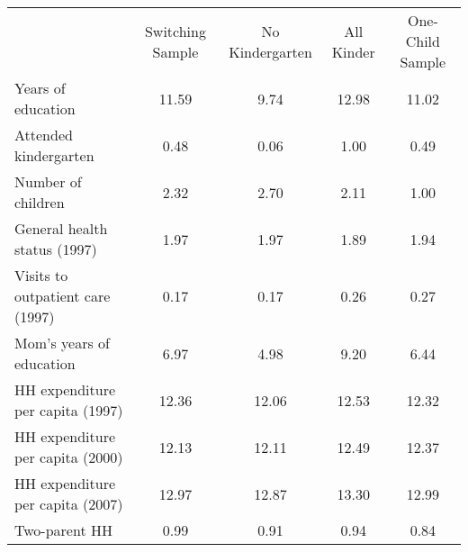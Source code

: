 \begin{tabular}{lllll}
\cline{1-5}
\multicolumn{1}{c}{} &
  \multicolumn{1}{|c}{Switching Sample} &
  \multicolumn{1}{c}{No Kindergarten} &
  \multicolumn{1}{c}{All Kinder} &
  \multicolumn{1}{c}{One-Child Sample} \\
\cline{1-5}
\multicolumn{1}{l}{Years of education} &
  \multicolumn{1}{|c}{11.59} &
  \multicolumn{1}{c}{9.74} &
  \multicolumn{1}{c}{12.98} &
  \multicolumn{1}{c}{11.02} \\
\multicolumn{1}{l}{Attended kindergarten} &
  \multicolumn{1}{|c}{0.48} &
  \multicolumn{1}{c}{0.06} &
  \multicolumn{1}{c}{1.00} &
  \multicolumn{1}{c}{0.49} \\
\multicolumn{1}{l}{Number of children} &
  \multicolumn{1}{|c}{2.32} &
  \multicolumn{1}{c}{2.70} &
  \multicolumn{1}{c}{2.11} &
  \multicolumn{1}{c}{1.00} \\
\multicolumn{1}{l}{General health status (1997)} &
  \multicolumn{1}{|c}{1.97} &
  \multicolumn{1}{c}{1.97} &
  \multicolumn{1}{c}{1.89} &
  \multicolumn{1}{c}{1.94} \\
\multicolumn{1}{l}{Visits to outpatient care (1997)} &
  \multicolumn{1}{|c}{0.17} &
  \multicolumn{1}{c}{0.17} &
  \multicolumn{1}{c}{0.26} &
  \multicolumn{1}{c}{0.27} \\
\multicolumn{1}{l}{Mom's years of education} &
  \multicolumn{1}{|c}{6.97} &
  \multicolumn{1}{c}{4.98} &
  \multicolumn{1}{c}{9.20} &
  \multicolumn{1}{c}{6.44} \\
\multicolumn{1}{l}{HH expenditure per capita (1997)} &
  \multicolumn{1}{|c}{12.36} &
  \multicolumn{1}{c}{12.06} &
  \multicolumn{1}{c}{12.53} &
  \multicolumn{1}{c}{12.32} \\
\multicolumn{1}{l}{HH expenditure per capita (2000)} &
  \multicolumn{1}{|c}{12.13} &
  \multicolumn{1}{c}{12.11} &
  \multicolumn{1}{c}{12.49} &
  \multicolumn{1}{c}{12.37} \\
\multicolumn{1}{l}{HH expenditure per capita (2007)} &
  \multicolumn{1}{|c}{12.97} &
  \multicolumn{1}{c}{12.87} &
  \multicolumn{1}{c}{13.30} &
  \multicolumn{1}{c}{12.99} \\
\multicolumn{1}{l}{Two-parent HH} &
  \multicolumn{1}{|c}{0.99} &
  \multicolumn{1}{c}{0.91} &
  \multicolumn{1}{c}{0.94} &
  \multicolumn{1}{c}{0.84} \\
\cline{1-5}
\end{tabular}
